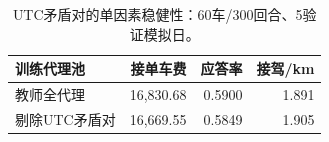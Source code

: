 \begin{table}[htbp]\centering\small
\caption{UTC矛盾对的单因素稳健性：60车/300回合、5验证模拟日。}\label{tab:offset}
\begin{tabularx}{\linewidth}{Yrrr}\toprule
训练代理池 & 接单车费 & 应答率 & 接驾/km\\\midrule
教师全代理 & 16,830.68 & 0.5900 & 1.891\\
剔除UTC矛盾对 & 16,669.55 & 0.5849 & 1.905\\
\bottomrule\end{tabularx}
\end{table}
